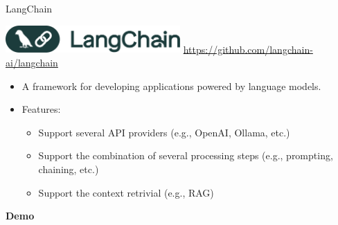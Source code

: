 \documentclass[presentation, 10pt]{beamer}\mode<presentation>{\usetheme{AMSBolognaFC}}
\begin{document}
\begin{frame}{LangChain}
\begin{center}
\includegraphics[width=0.5\textwidth]{img/logo.png}
\url{https://github.com/langchain-ai/langchain}
\end{center}
\begin{itemize}
	\item A framework for developing applications powered by language models.
	\item Features:	
	\begin{itemize}
		\item Support several API providers (e.g., OpenAI, Ollama, etc.)
		\item Support the combination of several processing steps (e.g., prompting, chaining, etc.)
		\item Support the context retrivial (e.g., RAG)
	\end{itemize}
\end{itemize}
\begin{center}
\huge{\textbf{Demo}}
\end{center}
\end{frame}
\end{document}
